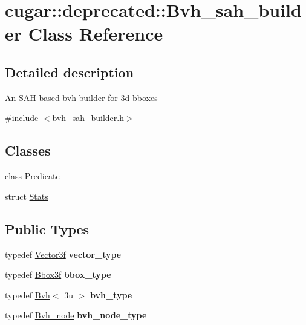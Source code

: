 \hypertarget{classcugar_1_1deprecated_1_1_bvh__sah__builder}{}\section{cugar\+:\+:deprecated\+:\+:Bvh\+\_\+sah\+\_\+builder Class Reference}
\label{classcugar_1_1deprecated_1_1_bvh__sah__builder}


\subsection{Detailed description}
An S\+A\+H-\/based bvh builder for 3d bboxes 

{\ttfamily \#include $<$bvh\+\_\+sah\+\_\+builder.\+h$>$}

\subsection*{Classes}
\begin{DoxyCompactItemize}
\item 
class \hyperlink{classcugar_1_1deprecated_1_1_bvh__sah__builder_1_1_predicate}{Predicate}
\item 
struct \hyperlink{structcugar_1_1deprecated_1_1_bvh__sah__builder_1_1_stats}{Stats}
\end{DoxyCompactItemize}
\subsection*{Public Types}
\begin{DoxyCompactItemize}
\item 
\mbox{\label{classcugar_1_1deprecated_1_1_bvh__sah__builder_aaf68c19b94d2be268030b3bd2c8d3d81}} 
typedef \hyperlink{structcugar_1_1_vector}{Vector3f} {\bfseries vector\+\_\+type}
\item 
\mbox{\label{classcugar_1_1deprecated_1_1_bvh__sah__builder_a525c2db97b1487a333440226eb3ed5ac}} 
typedef \hyperlink{structcugar_1_1_bbox}{Bbox3f} {\bfseries bbox\+\_\+type}
\item 
\mbox{\label{classcugar_1_1deprecated_1_1_bvh__sah__builder_aa93001869027086f1149cf877174a510}} 
typedef \hyperlink{structcugar_1_1_bvh}{Bvh}$<$ 3u $>$ {\bfseries bvh\+\_\+type}
\item 
\mbox{\label{classcugar_1_1deprecated_1_1_bvh__sah__builder_a82ddece4c77ba4019a41aefafc2fca77}} 
typedef \hyperlink{structcugar_1_1_bvh__node}{Bvh\+\_\+node} {\bfseries bvh\+\_\+node\+\_\+type}
\end{DoxyCompactItemize}
